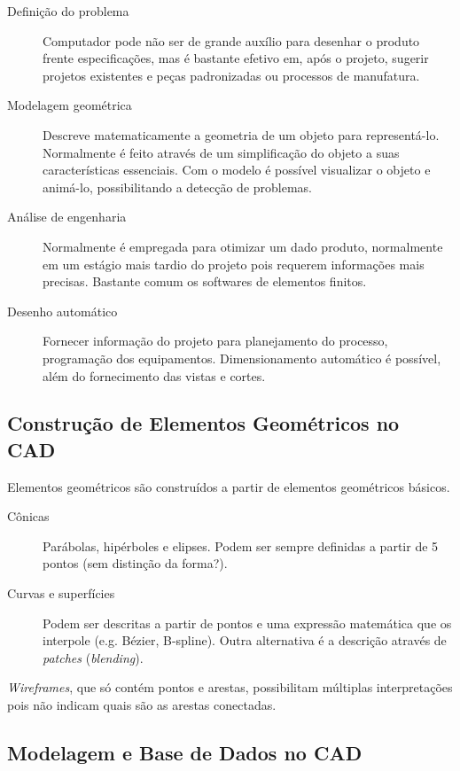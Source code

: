 \documentclass[a4paper]{report}
\begin{document}
\begin{description}
    \item[Definição do problema] Computador pode não ser de grande auxílio para desenhar o produto frente especificações, mas é bastante efetivo em, após o projeto, sugerir projetos existentes e peças padronizadas ou processos de manufatura.
    \item[Modelagem geométrica] Descreve matematicamente a geometria de um objeto para representá-lo. Normalmente é feito através de um simplificação do objeto a suas características essenciais. Com o modelo é possível visualizar o objeto e animá-lo, possibilitando a detecção de problemas.
    \item[Análise de engenharia] Normalmente é empregada para otimizar um dado produto, normalmente em um estágio mais tardio do projeto pois requerem informações mais precisas. Bastante comum os softwares de elementos finitos.
    \item[Desenho automático] Fornecer informação do projeto para planejamento do processo, programação dos equipamentos. Dimensionamento automático é possível, além do fornecimento das vistas e cortes.
\end{description}

\subsection*{Construção de Elementos Geométricos no CAD}

Elementos geométricos são construídos a partir de elementos geométricos básicos.

\begin{description}
    \item[Cônicas] Parábolas, hipérboles e elipses. Podem ser sempre definidas a partir de 5 pontos (sem distinção da forma?).
    \item[Curvas e superfícies] Podem ser descritas a partir de pontos e uma expressão matemática que os interpole (e.g. Bézier, B-spline). Outra alternativa é a descrição através de \emph{patches} (\emph{blending}).
\end{description}

\emph{Wireframes}, que só contém pontos e arestas, possibilitam múltiplas interpretações pois não indicam quais são as arestas conectadas.

\subsection*{Modelagem e Base de Dados no CAD}
\end{document}
